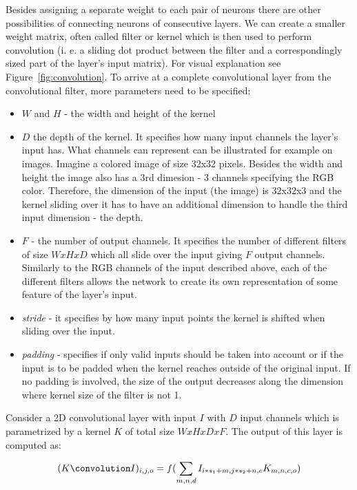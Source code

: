 Besides assigning a separate weight to each pair of neurons there are other possibilities of connecting neurons of consecutive layers.
We can create a smaller weight matrix, often called filter or kernel which is then used to perform convolution (i. e. a sliding dot product between the filter and a correspondingly sized part of the layer's input matrix). 
For visual explanation see Figure~\ref{fig:convolution}.
To arrive at a complete convolutional layer from the convolutional filter, more parameters need to be specified:
\begin{itemize}
    \item $W$  and $H$ - the width and height of the kernel
    \item $D$ the depth of the kernel. 
    It specifies how many input channels the layer's input has.
    What channels can represent can be illustrated for example on images.
    Imagine a colored image of size 32x32 pixels.
    Besides the width and height the image also has a 3rd dimesion - 3 channels specifying the RGB color.
    Therefore, the dimension of the input (the image) is 32x32x3 and the kernel sliding over it has to have an additional dimension to handle the third input dimension - the depth.
    \item $F$ - the number of output channels. 
    It specifies the number of different filters of size $WxHxD$ which all slide over the input giving $F$ output channels. 
    Similarly to the RGB channels of the input described above, each of the different filters allows the network to create its own representation of some feature of the layer's input.    
    \item \textit{stride} - it specifies by how many input points the kernel is shifted when sliding over the input. 
    \item \textit{padding} - specifies if only valid inputs should be taken into account or if the input is to be padded when the kernel reaches outside of the original input.
    If no padding is involved, the size of the output decreases along the dimension where kernel size of the filter is not 1.
\end{itemize}

Consider a 2D convolutional layer with input $I$ with $D$ input channels which is parametrized by a kernel $K$ of total size $WxHxDxF$. The output of this layer is computed as:

\begin{equation}
    (K \convolution I)_{i,j,o} = f(\sum_{m,n,d} I_{i*s_1+m,j*s_2+n,c} K_{m,n,c,o})
    \label{eq:convolution}
\end{equation}

